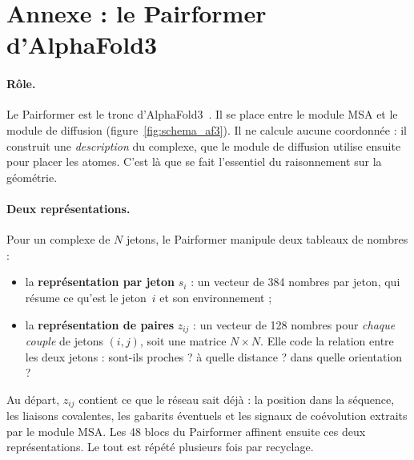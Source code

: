 \section{Annexe : le Pairformer d'AlphaFold3}
\label{annexe:pairformer}

\paragraph{Rôle.} Le Pairformer est le \og tronc \fg{} d'AlphaFold3~\cite{abramson2024}. Il se place entre le module MSA et le module de diffusion (figure~\ref{fig:schema_af3}). Il ne calcule aucune coordonnée : il construit une \emph{description} du complexe, que le module de diffusion utilise ensuite pour placer les atomes. C'est là que se fait l'essentiel du \og raisonnement \fg{} sur la géométrie.

\paragraph{Deux représentations.} Pour un complexe de $N$ jetons, le Pairformer manipule deux tableaux de nombres :
\begin{itemize}
  \item la \textbf{représentation par jeton} $s_i$ : un vecteur de 384 nombres par jeton, qui résume \og ce qu'est \fg{} le jeton~$i$ et son environnement ;
  \item la \textbf{représentation de paires} $z_{ij}$ : un vecteur de 128 nombres pour \emph{chaque couple} de jetons $(i,j)$, soit une matrice $N \times N$. Elle code la relation entre les deux jetons : sont-ils proches ? à quelle distance ? dans quelle orientation ?
\end{itemize}
Au départ, $z_{ij}$ contient ce que le réseau sait déjà : la position dans la séquence, les liaisons covalentes, les gabarits éventuels et les signaux de coévolution extraits par le module MSA. Les 48 blocs du Pairformer affinent ensuite ces deux représentations. Le tout est répété plusieurs fois par recyclage.

